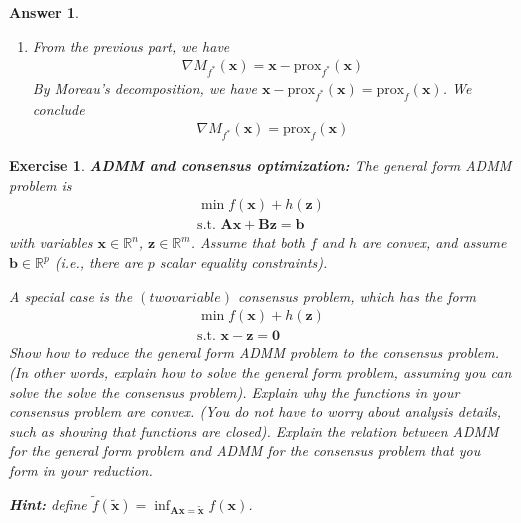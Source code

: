 \documentclass[12pt]{article}
\theoremstyle{colon}
\newtheorem{exercise}{Exercise}
\newtheorem*{answer}{Answer}
\begin{document}
\begin{answer}
\begin{enumerate}[label=\alph*)]
		\item From the previous part, we have
			\begin{gather*}
				\nabla M_{f^*} (\bm{x}) = \bm{x} - \text{prox}_{f^*}(\bm{x})
			\end{gather*}
			By Moreau's decomposition, we have $\bm{x} - \text{prox}_{f^*}(\bm{x}) = \text{prox}_{f}(\bm{x})$. We conclude
			\begin{gather*}
				\nabla M_{f^*} (\bm{x}) = \text{prox}_{f}(\bm{x})
			\end{gather*}
	\end{enumerate}
\end{answer}

\clearpage

\begin{exercise}
	\textbf{ADMM and consensus optimization:} The general form ADMM problem is
	\begin{gather*}
		\min f(\bm{x}) + h(\bm{z}) \\
		\text{s.t. } \bm{A} \bm{x} + \bm{B} \bm{z} = \bm{b}
	\end{gather*}
	with variables $\bm{x} \in \mathbb{R}^n$, $\bm{z} \in \mathbb{R}^m$. Assume that both $f$ and $h$ are convex, and assume $\bm{b} \in \mathbb{R}^p$ (i.e., there are $p$ scalar equality constraints).

	A special case is the $(two variable)$ consensus problem, which has the form
	\begin{gather*}
		\min f(\bm{x}) + h(\bm{z}) \\
		\text{s.t. } \bm{x} - \bm{z} = \bm{0}
	\end{gather*}
	Show how to reduce the general form ADMM problem to the consensus problem. (In other words, explain how to solve the general form problem, assuming you can solve the solve the consensus problem). Explain why the functions in your consensus problem are convex. (You do not have to worry about analysis details, such as showing that functions are closed). Explain the relation between ADMM for the general form problem and ADMM for the consensus problem that you form in your reduction.

	\textbf{Hint: } define $\tilde{f}(\tilde{\bm{x}}) = \inf_{\bm{A}\bm{x} = \tilde{\bm{x}}} f(\bm{x})$.
\end{exercise}
\end{document}

